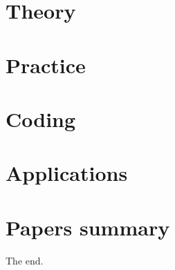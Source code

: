 \documentclass[oneside]{book}
\begin{document}
\part{Theory}\label{prt:theory}

% 



%
%
%



%


%
%





% 
% 
% 
% 






\part{Practice}\label{prt:practice}
%
%







%


%

\part{Coding}\label{prt:coding}

%







\part{Applications}\label{prt:apps}



\part{Papers summary}\label{prt:papers}

The end.  %


\clearpage
\end{document}
